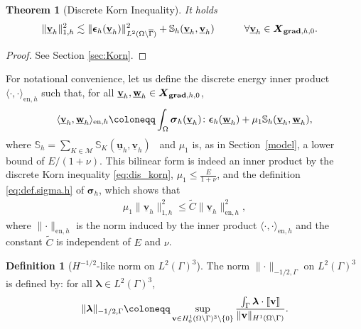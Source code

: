 \documentclass[a4paper,11pt]{article}
\newtheorem{theorem}{Theorem}[section]
\theoremstyle{definition}
\newtheorem{defn}{Definition}[section]
\theoremstyle{remark}
\newcommand{\uvec}[1]{\underline{\mathbf{#1}}}
\newcommand{\bo}[1]{\mathbf{#1}}
\def\bsig{\boldsymbol{\sigma}}
\def\be{\boldsymbol{\epsilon}}
\def\cM{\mathcal{M}}
\def\blambda{\boldsymbol{\lambda}}
\def\ddgs{\boldsymbol{X}_{{\bf grad},h,0}}
\def\sjump#1{[\hskip -1.5pt[#1]\hskip -1.5pt]}
\def\O{\Omega}
\begin{document}
\begin{theorem}[Discrete Korn Inequality]\label{thm:korn}
It holds
\begin{alignat}{2}\label{eq:dis_korn}
\lVert \uvec{v}_h\rVert_{1,h}^2&\lesssim \lVert \be_h(\uvec{v}_h)\rVert^2_{L^2(\O\setminus\overline{\Gamma})}+\mathbb S_h(\uvec{v}_h,\uvec{v}_h)&&\qquad\forall\uvec{v}_h\in\ddgs.
\end{alignat}
\end{theorem}
\begin{proof}
See Section \ref{sec:Korn}.
\end{proof}

For notational convenience, let us define the discrete energy inner product $\langle\cdot,\cdot\rangle_{\mathrm{en},h}$ such that, for all $\uvec{v}_h,\uvec{w}_h\in\ddgs$,
\begin{align}\label{eq:def.inner.Eh}
\langle\uvec{v}_h,\uvec{w}_h\rangle_{\mathrm{en},h}\coloneqq\int_{\Omega}\bsig_h(\underline{\bf v}_h)\colon\be_h(\underline{\bf w}_h)+\mu_{1}\mathbb S_h(\underline{\bf v}_h,\underline{\bf w}_h),
\end{align}
where $\mathbb S_h=\sum_{K\in\cM}\mathbb S_K(\uvec{u}_h,\uvec{v}_h)$ ~and $\mu_{1}$ is, as in Section~\ref{model}, a lower bound of $E/(1+\nu)$. This bilinear form is indeed an inner product by the discrete Korn inequality \eqref{eq:dis_korn}, $\mu_{1}\leq \frac{E}{1+\nu}$, and the definition \eqref{eq:def.sigma.h} of $\bsig_h$, which shows that
\begin{align}\label{eq:norm_energy}
\mu_{1}\lVert \uvec{v}_h\rVert_{1,h}^2\leq \widetilde{C} \lVert \uvec{v}_h\rVert_{\mathrm{en},h}^2,
\end{align}
where $\lVert\cdot\rVert_{\mathrm{en},h}$ is the norm induced by the inner product $\langle\cdot,\cdot\rangle_{\mathrm{en},h}$ and the constant $\widetilde{C}$ is independent of $E$ and $\nu$.

\begin{defn}[${H}^{-1/2}$-like norm on $L^2(\Gamma)^3$]\label{def:H^{-1/2}}
The norm $\lVert \cdot \rVert_{-1/2,\Gamma}$ on  $L^2(\Gamma)^3$ is defined by: for all $\blambda\in L^2(\Gamma)^3$,
\begin{align}\label{eq:def.dis{-1/2}norm}
\lVert \blambda\rVert_{-1/2,\Gamma}\coloneqq\sup\limits_{\bo{v}\in {H}^1_0(\O\setminus\Gamma)^{3}\setminus\{0\}}{}\frac{\int_{\Gamma}\blambda\cdot\sjump{\bo{v}}}{\lVert \bo{v}\rVert_{{H}^1(\O\setminus\Gamma)}}.
\end{align}
\end{defn}
\end{document}
